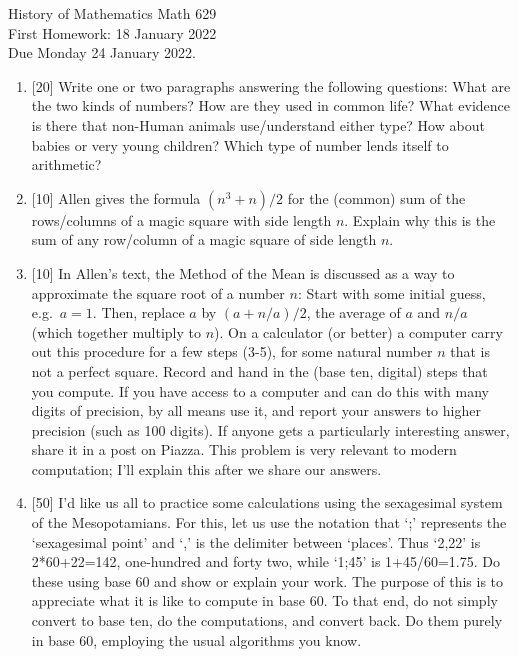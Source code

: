\documentclass[12pt]{article}
\begin{document}
\LARGE 
\noindent
{\color{Maroon}History of Mathematics \hfill Math 629}\vspace{2pt}\\
\large
First Homework: \hfill 18 January 2022\\
Due Monday 24 January 2022.
\normalsize\vspace{10pt}

\begin{enumerate}

\item {[20]}
    Write one or two paragraphs answering the following questions: What are the two kinds of numbers? How are they used in common life? What
    evidence is there that non-Human animals use/understand either type? How about babies or very young children? Which type of number lends
    itself to arithmetic? 

\item {[10]}
      Allen gives the formula $(n^3+n)/2$ for the (common) sum of the rows/columns of a magic square with side length $n$.
      Explain why this is the sum of any row/column of a magic square of side length $n$.

\item {[10]}
    In Allen's text, the Method of the Mean is discussed as a way to approximate the square root of a number $n$: Start with some initial
    guess, e.g.\  $a=1$.
    Then, replace $a$ by $(a + n/a)/2$, the average of $a$ and $n/a$ (which together multiply to $n$). On a calculator (or better) a
    computer carry out this procedure for a few steps (3-5), for some natural number $n$ that is not a perfect square. Record and hand in the
    (base ten, digital) steps that you compute. If you have access to a computer and can do this with many digits of precision, by all means
    use it, and report your answers to higher precision (such as 100 digits). If anyone gets a particularly interesting answer, share it in
    a post on Piazza. This problem is very relevant to modern computation; I'll explain this after we share our answers.

\item {[50]}    
    I'd like us all to practice some calculations using the sexagesimal system of the Mesopotamians. For this, let us use the notation that
    `;' represents the `sexagesimal point' and `,' is the delimiter between `places'. Thus `2,22' is 2*60+22=142, one-hundred and forty two,
    while `1;45' is 1+45/60=1.75. Do these using base 60 and show or explain your work. The purpose of this is to appreciate what it is like
    to compute in base 60. To that end, do not simply convert to base ten, do the computations, and convert back. Do them purely in base 60,
    employing the usual algorithms you know.


\end{enumerate}
\end{document}
